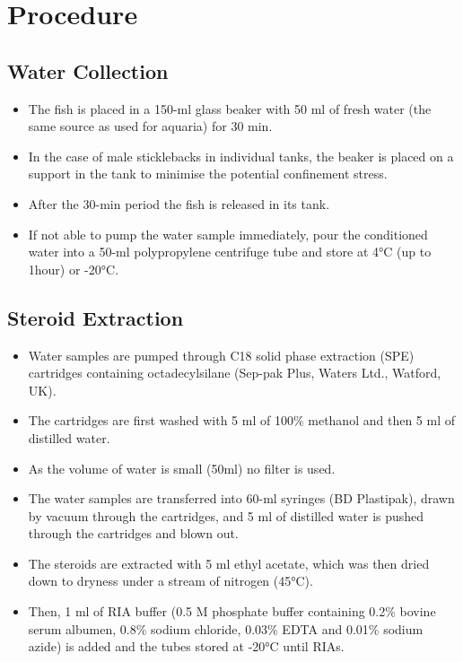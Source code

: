 \documentclass[
  letterpaper,
  DIV=11,
  numbers=noendperiod]{scrreprt}
\providecommand{\tightlist}{%
  \setlength{\itemsep}{0pt}\setlength{\parskip}{0pt}}\usepackage{longtable,booktabs,array}
\begin{document}
\hypertarget{procedure-56}{%
\section{Procedure}\label{procedure-56}}

\hypertarget{water-collection}{%
\subsection{Water Collection}\label{water-collection}}

\begin{itemize}
\tightlist
\item
  The fish is placed in a 150-ml glass beaker with 50 ml of fresh water
  (the same source as used for aquaria) for 30 min.
\item
  In the case of male sticklebacks in individual tanks, the beaker is
  placed on a support in the tank to minimise the potential confinement
  stress.
\item
  After the 30-min period the fish is released in its tank.
\item
  If not able to pump the water sample immediately, pour the conditioned
  water into a 50-ml polypropylene centrifuge tube and store at 4°C (up
  to 1hour) or -20°C.
\end{itemize}

\hypertarget{steroid-extraction}{%
\subsection{Steroid Extraction}\label{steroid-extraction}}

\begin{itemize}
\tightlist
\item
  Water samples are pumped through C18 solid phase extraction (SPE)
  cartridges containing octadecylsilane (Sep-pak Plus, Waters Ltd.,
  Watford, UK).
\item
  The cartridges are first washed with 5 ml of 100\% methanol and then 5
  ml of distilled water.
\item
  As the volume of water is small (50ml) no filter is used.
\item
  The water samples are transferred into 60-ml syringes (BD Plastipak),
  drawn by vacuum through the cartridges, and 5 ml of distilled water is
  pushed through the cartridges and blown out.
\item
  The steroids are extracted with 5 ml ethyl acetate, which was then
  dried down to dryness under a stream of nitrogen (45°C).
\item
  Then, 1 ml of RIA buffer (0.5 M phosphate buffer containing 0.2\%
  bovine serum albumen, 0.8\% sodium chloride, 0.03\% EDTA and 0.01\%
  sodium azide) is added and the tubes stored at -20°C until RIAs.
\end{itemize}
\end{document}
